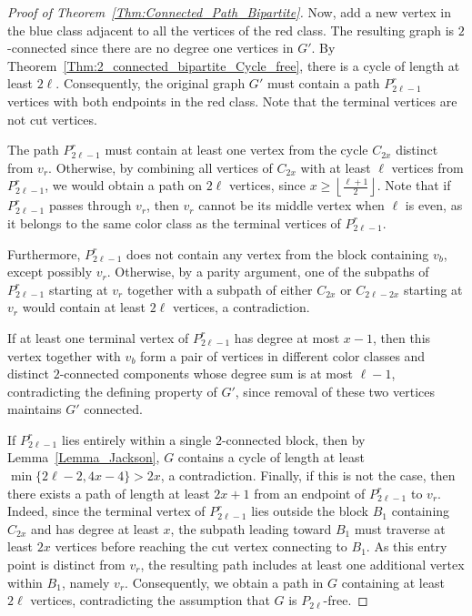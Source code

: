\documentclass[11pt,a4paper]{article}
\begin{document}
\begin{proof}[Proof of Theorem~\ref{Thm:Connected_Path_Bipartite}]
Now, add a new vertex in the blue class adjacent to all the vertices of the red class.  
The resulting graph is $2$-connected since there are no degree one vertices in $G'$.
By Theorem~\ref{Thm:2_connected_bipartite_Cycle_free}, there is a cycle of length at least $2\ell$.  
Consequently, the original graph $G'$ must contain a path $P^r_{2\ell - 1}$ vertices with both endpoints in the red class. Note that the terminal vertices are not cut vertices.   

The path $P^r_{2\ell - 1}$ must contain at least one vertex from the cycle $C_{2x}$ distinct from $v_r$.
Otherwise, by combining all vertices of $C_{2x}$ with at least $\ell$ vertices from $P^r_{2\ell - 1}$, we would obtain a path on $2\ell$ vertices, since $x \ge \left\lfloor \tfrac{\ell + 1}{2} \right\rfloor$.
Note that if $P^r_{2\ell - 1}$ passes through $v_r$, then $v_r$ cannot be its middle vertex when $\ell$ is even, as it belongs to the same color class as the terminal vertices of $P^r_{2\ell - 1}$.

Furthermore, $P^r_{2\ell - 1}$ does not contain any vertex from the block containing $v_b$, except possibly $v_r$.
Otherwise, by a parity argument, one of the subpaths of $P^r_{2\ell - 1}$ starting at $v_r$ together with a subpath of either $C_{2x}$ or $C_{2\ell - 2x}$ starting at $v_r$ would contain at least $2\ell$ vertices, a contradiction.


If at least one terminal vertex of $P^r_{2\ell - 1}$ has degree at most $x - 1$, then this vertex together with $v_b$ form a pair of vertices in different color classes and distinct $2$-connected components whose degree sum is at most $\ell - 1$, contradicting the defining property of $G'$, since removal of these two vertices maintains $G'$ connected.

If $P^r_{2\ell - 1}$ lies entirely within a single $2$-connected block, then by Lemma~\ref{Lemma_Jackson}, $G$ contains a cycle of length at least $\min\{2\ell - 2, 4x - 4\} > 2x$, a contradiction.
Finally, if this is not the case, then there exists a path of length at least $2x + 1$ from an endpoint of $P^r_{2\ell - 1}$ to $v_r$.  
Indeed, since the terminal vertex of $P^r_{2\ell - 1}$ lies outside the block $B_1$ containing $C_{2x}$ and has degree at least $x$, the subpath leading toward $B_1$ must traverse at least $2x$ vertices before reaching the cut vertex connecting to $B_1$.  
As this entry point is distinct from $v_r$, the resulting path includes at least one additional vertex within $B_1$, namely $v_r$.  
Consequently, we obtain a path in $G$ containing at least $2\ell$ vertices, contradicting the assumption that $G$ is $P_{2\ell}$-free.

\end{proof}
\end{document}
